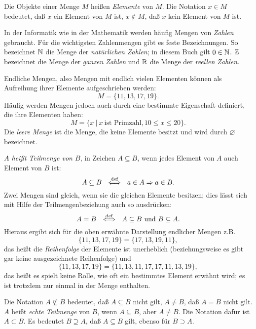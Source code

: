 Die Objekte einer Menge $M$ heißen \emph{Elemente} von $M$. Die Notation
$ x \in M$ 
bedeutet, daß $x$ ein Element von $M$ ist, $x \not \in M$, daß $x$ kein
Element von $M$ ist.

In der Informatik wie in der Mathematik werden häufig Mengen von \emph{Zahlen} gebraucht.  Für die wichtigsten
Zahlenmengen gibt es feste Bezeichnungen.  So bezeichnet $\mathbb{N}$
die Menge der \emph{natürlichen Zahlen};  in diesem Buch gilt
$0\in\mathbb{N}$. 
$\mathbb{Z}$ bezeichnet die Menge der \emph{ganzen Zahlen} und $\mathbb{R}$ die Menge der
\emph{reellen Zahlen}.

Endliche Mengen, also Mengen mit endlich vielen Elementen
können als Aufreihung ihrer Elemente aufgeschrieben werden:
\[M = \{ 11, 13, 17, 19\}.\]
Häufig werden Mengen jedoch auch durch eine bestimmte Eigenschaft de\-fi\-niert,
die ihre Elementen haben:
\[M = \{x\ |\ x\ \mbox{ist Primzahl}, 10 \le x \le 20\}.\]
Die \emph{leere Menge} %
ist die Menge, die keine Elemente besitzt und wird
durch $\varnothing$ bezeichnet.

\emph{$A$ heißt Teilmenge von $B$}, in Zeichen $A \subseteq B$, 
wenn jedes Element von $A$ auch Element von $B$ ist:
\[A \subseteq B\ \ \diff\ \ 
a \in A \Rightarrow a \in B.\]
Zwei Mengen sind gleich, wenn sie die gleichen Elemente besitzen; 
dies lässt sich mit Hilfe der Teilmengenbeziehung auch so ausdrücken:
\[A = B\ \ \stackrel{\rm def}{\Longleftrightarrow}\ \ A \subseteq B\ \mbox{und}\ B \subseteq A.\]
Hieraus ergibt sich für die oben erwähnte Darstellung endlicher Mengen
z.B.
\[\{11,13,17,19\} =\{17,13,19,11\},\]
das heißt die \emph{Reihenfolge} der Elemente ist unerheblich (beziehungsweise es gibt
gar keine ausgezeichnete Reihenfolge) und
\[\{11,13,17,19\} = \{11,13,11,17,17,11,13,19\},\]
das heißt es spielt keine Rolle, wie oft ein bestimmtes Element erwähnt wird; es
ist trotzdem nur einmal in der Menge enthalten.

Die Notation $A \not \subseteq B$ bedeutet, daß $A \subseteq B$ nicht gilt, $A
\not = B$, daß $A = B$ nicht gilt. $A$ heißt \emph{echte Teilmenge} von $B$,
wenn $A \subseteq B$, aber $A \not = B$. Die Notation dafür ist $A \subset B$.
\index{*@$\subset$}\index{*@$\supseteq$}\index{*@$\supset$}
Es bedeutet $B \supseteq A$, daß $A \subseteq B$ gilt, ebenso für
$B \supset A$. 

